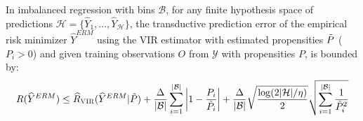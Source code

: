 \begin{theorem} 
In imbalanced regression with bins $\mathcal{B}$, for any finite hypothesis space of predictions $\mathcal{H} = \{\hat{Y}_{1}, ..., \hat{Y}_{\mathcal{H}}\}$, the transductive prediction error of the empirical risk minimizer $\hat{Y}^{ERM}$ using the VIR estimator with estimated propensities $\Tilde{P}$ ($P_{i} > 0$) and given training observations $O$ from $\mathcal{Y}$ with propensities $P$, is bounded by:
%
\begin{align}
     R (\hat{Y}^{ERM}) \leq \hat{R}_{\textsc{VIR}}(\hat{Y}^{ERM} | \Tilde{P}) + \dfrac{\Delta}{|\mathcal{B}|} \sum_{i=1}^{|\mathcal{B}|} \bigg| 1 - \dfrac{P_{i}}{\Tilde{P}_{i}} \bigg| + \dfrac{\Delta}{|\mathcal{B}|} \sqrt{\dfrac{\log (2 |\mathcal{H}| / \eta)}{2}} \sqrt{\sum_{i=1}^{|\mathcal{B}|} \dfrac{1}{\Tilde{P}_{i}^{2}}}
\end{align}
%
\end{theorem}
